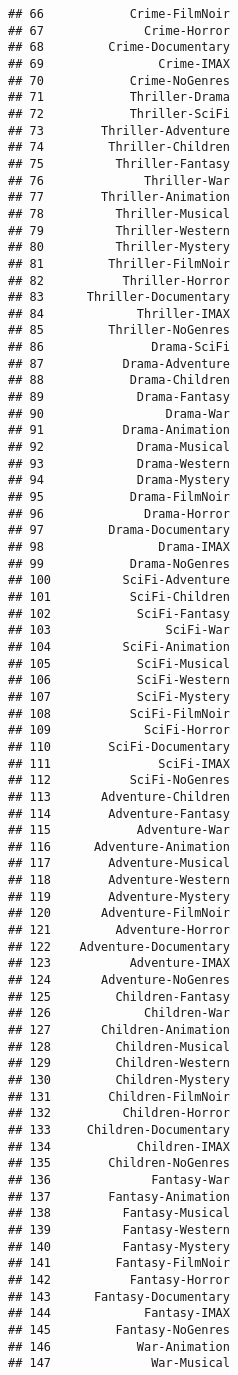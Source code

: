 \documentclass[
]{article}
\begin{document}
\begin{verbatim}
## 66            Crime-FilmNoir
## 67              Crime-Horror
## 68         Crime-Documentary
## 69                Crime-IMAX
## 70            Crime-NoGenres
## 71            Thriller-Drama
## 72            Thriller-SciFi
## 73        Thriller-Adventure
## 74         Thriller-Children
## 75          Thriller-Fantasy
## 76              Thriller-War
## 77        Thriller-Animation
## 78          Thriller-Musical
## 79          Thriller-Western
## 80          Thriller-Mystery
## 81         Thriller-FilmNoir
## 82           Thriller-Horror
## 83      Thriller-Documentary
## 84             Thriller-IMAX
## 85         Thriller-NoGenres
## 86               Drama-SciFi
## 87           Drama-Adventure
## 88            Drama-Children
## 89             Drama-Fantasy
## 90                 Drama-War
## 91           Drama-Animation
## 92             Drama-Musical
## 93             Drama-Western
## 94             Drama-Mystery
## 95            Drama-FilmNoir
## 96              Drama-Horror
## 97         Drama-Documentary
## 98                Drama-IMAX
## 99            Drama-NoGenres
## 100          SciFi-Adventure
## 101           SciFi-Children
## 102            SciFi-Fantasy
## 103                SciFi-War
## 104          SciFi-Animation
## 105            SciFi-Musical
## 106            SciFi-Western
## 107            SciFi-Mystery
## 108           SciFi-FilmNoir
## 109             SciFi-Horror
## 110        SciFi-Documentary
## 111               SciFi-IMAX
## 112           SciFi-NoGenres
## 113       Adventure-Children
## 114        Adventure-Fantasy
## 115            Adventure-War
## 116      Adventure-Animation
## 117        Adventure-Musical
## 118        Adventure-Western
## 119        Adventure-Mystery
## 120       Adventure-FilmNoir
## 121         Adventure-Horror
## 122    Adventure-Documentary
## 123           Adventure-IMAX
## 124       Adventure-NoGenres
## 125         Children-Fantasy
## 126             Children-War
## 127       Children-Animation
## 128         Children-Musical
## 129         Children-Western
## 130         Children-Mystery
## 131        Children-FilmNoir
## 132          Children-Horror
## 133     Children-Documentary
## 134            Children-IMAX
## 135        Children-NoGenres
## 136              Fantasy-War
## 137        Fantasy-Animation
## 138          Fantasy-Musical
## 139          Fantasy-Western
## 140          Fantasy-Mystery
## 141         Fantasy-FilmNoir
## 142           Fantasy-Horror
## 143      Fantasy-Documentary
## 144             Fantasy-IMAX
## 145         Fantasy-NoGenres
## 146            War-Animation
## 147              War-Musical

\end{verbatim}
\end{document}
